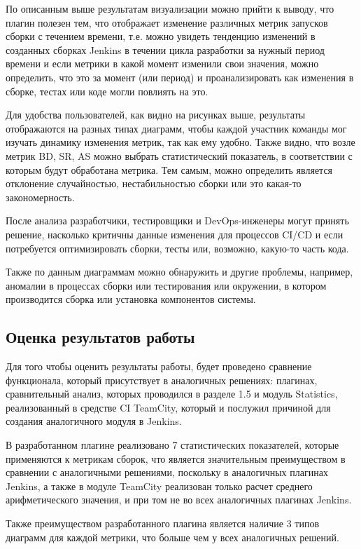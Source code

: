 По описанным выше результатам визуализации можно прийти к выводу, что плагин полезен тем, что отображает изменение различных метрик запусков сборки с течением времени, т.е. можно увидеть тенденцию изменений в созданных сборках Jenkins в течении цикла разработки за нужный период времени и если метрики в какой момент изменили свои значения, можно определить, что это за момент (или период) и проанализировать как изменения в сборке, тестах или коде могли повлиять на это.

Для удобства пользователей, как видно на рисунках выше, результаты отображаются на разных типах диаграмм, чтобы каждой участник команды мог изучать динамику изменения метрик, так как ему удобно. Также видно, что возле метрик BD, SR, AS можно выбрать статистический показатель, в соответствии с которым будут обработана метрика. Тем самым, можно определить является отклонение случайностью, нестабильностью сборки или это какая-то закономерность.

После анализа разработчики, тестировщики и DevOps-инженеры могут принять решение, насколько критичны данные изменения для процессов CI/CD и если потребуется оптимизировать сборки, тесты или, возможно, какую-то часть кода.

Также по данным диаграммам можно обнаружить и другие проблемы, например, аномалии в процессах сборки или тестирования или окружении, в котором производится сборка или установка компонентов системы.

 \subsection{Оценка результатов работы}
 
 Для того чтобы оценить результаты работы, будет проведено сравнение функционала, который присутствует в аналогичных решениях: плагинах, сравнительный анализ, которых проводился в разделе 1.5 и модуль Statistics, реализованный в средстве CI TeamCity, который и послужил причиной для создания аналогичного модуля в Jenkins.
 
 
 


В разработанном плагине реализовано 7 статистических показателей, которые применяются к метрикам сборок, что является значительным преимуществом в сравнении с аналогичными решениями, поскольку в аналогичных плагинах Jenkins, а также в модуле TeamCity реализован только расчет среднего арифметического значения, и при том не во всех аналогичных плагинах Jenkins.

Также преимуществом разработанного плагина является наличие 3 типов диаграмм для каждой метрики, что больше чем у всех аналогичных решений.

